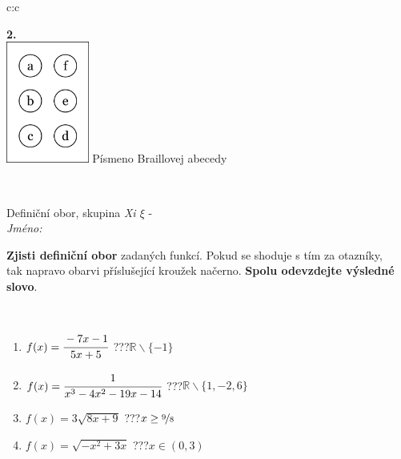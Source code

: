 \documentclass[10pt]{report}
\begin{document}
\begin{tabular}{c:c}
\begin{minipage}[c][104.5mm][t]{0.5\linewidth}
\begin{center}
\begin{minipage}{0.20\linewidth}
\begin{center}
{\Huge\bfseries 2.} \\[2mm]
\includegraphics[height=40mm]{../images/braille.png}
{\small Písmeno Braillovej abecedy}
\end{center}
\end{minipage}
\end{center}
\end{minipage}
\\ \hdashline
\begin{minipage}[c][104.5mm][t]{0.5\linewidth}
\begin{center}
\vspace{7mm}
{\huge Definiční obor, skupina \textit{Xi $\xi$} -}\\[5mm]
\textit{Jméno:}\phantom{xxxxxxxxxxxxxxxxxxxxxxxxxxxxxxxxxxxxxxxxxxxxxxxxxxxxxxxxxxxxxxxxx}\\[5mm]
\begin{minipage}{0.95\linewidth}
\begin{center}
\textbf{Zjisti definiční obor} zadaných funkcí. Pokud se shoduje s tím za otazníky,\\tak napravo obarvi příslušející kroužek načerno. \textbf{Spolu odevzdejte výsledné slovo}.
\end{center}
\end{minipage}
\\[1mm]
\begin{minipage}{0.79\linewidth}
\begin{center}
\begin{varwidth}{\linewidth}
\begin{enumerate}
\normalsizerrr
\item $f(x)=\cfrac{-7x-1}{5x+5}$\quad \dotfill\; ???\;\dotfill \quad $\mathbb{R}\smallsetminus\{-1\}$
\item $f(x)=\cfrac{1}{x^3-4x^2-19x-14}$\quad \dotfill\; ???\;\dotfill \quad $\mathbb{R}\smallsetminus\{1,-2,6\}$
\item $f(x)=3\sqrt{8x+9}$\quad \dotfill\; ???\;\dotfill \quad $x\geq\nicefrac{9}{8}$
\item $f(x)=\sqrt{-x^2+3x}$\quad \dotfill\; ???\;\dotfill \quad $x\in(0 , 3)$

\end{enumerate}
\end{varwidth}
\end{center}
\end{minipage}
\end{center}
\end{minipage}
\end{tabular}
\end{document}
